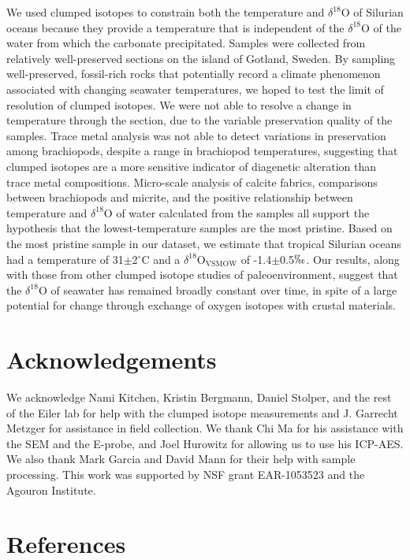 \documentclass[5p, authoryear]{elsarticle}
\begin{document}
We used clumped isotopes to constrain both the temperature and $\delta^{18}$O of Silurian oceans because they provide a temperature that is independent of the $\delta^{18}$O of the water from which the carbonate precipitated. Samples were collected from relatively well-preserved sections on the island of Gotland, Sweden. By sampling well-preserved, fossil-rich rocks that potentially record a climate phenomenon associated with changing seawater temperatures, we hoped to test the limit of resolution of clumped isotopes. We were not able to resolve a change in temperature through the section, due to the variable preservation quality of the samples. Trace metal analysis was not able to detect variations in preservation among brachiopods, despite a range in brachiopod temperatures, suggesting that clumped isotopes are a more sensitive indicator of diagenetic alteration than trace metal compositions. Micro-scale analysis of calcite fabrics, comparisons between brachiopods and micrite, and the positive relationship between temperature and $\delta^{18}$O of water calculated from the samples all support the hypothesis that the lowest-temperature samples are the most pristine. Based on the most pristine sample in our dataset, we estimate that tropical Silurian oceans had a temperature of 31$\pm$2$^{\circ}$C and a $\delta^{18}$O$_{\text{VSMOW}}$ of -1.4$\pm$0.5$\permil$. Our results, along with those from other clumped isotope studies of paleoenvironment, suggest that the $\delta^{18}$O of seawater has remained broadly constant over time, in spite of a large potential for change through exchange of oxygen isotopes with crustal materials. 

\section*{Acknowledgements}

We acknowledge Nami Kitchen, Kristin Bergmann, Daniel Stolper, and the rest of the Eiler lab for help with the clumped isotope measurements and J. Garrecht Metzger for assistance in field collection. We thank Chi Ma for his assistance with the SEM and the E-probe, and Joel Hurowitz for allowing us to use his ICP-AES. We also thank Mark Garcia and David Mann for their help with sample processing. This work was supported by NSF grant EAR-1053523 and the Agouron Institute. 

\nocite{*}

\section*{References}


\end{document}
